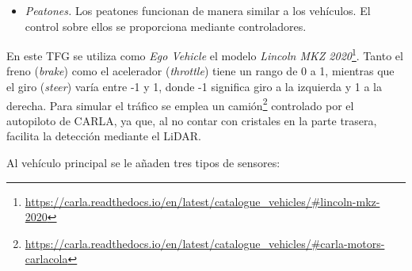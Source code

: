 \begin{itemize}
	\begin{code}[h]
	\begin{lstlisting}[language=python]
	
	vehicle_vp = world.get_blueprint_library().find(vehicle_type)
	vehicle_vp.set_attribute('role_name', 'hero') # Ego vehicle
	ego_vehicle = world.spawn_actor(vehicle_bp, transform)
	ego_vehicle.apply_control(carla.VehicleControl(throttle=0.5, steer=0.1, brake=0.01))

	\end{lstlisting}
	\caption[Configuración de \textit{Ego Vehicle} en CARLA]{Configuración de \textit{Ego Vehicle} en CARLA.}
	\label{cod:ego_carla}
	\end{code}
    \item \textit{Peatones.} Los peatones funcionan de manera similar a los vehículos. El control sobre ellos se proporciona mediante controladores.
\end{itemize}

En este \ac{TFG} se utiliza como \textit{Ego Vehicle} el modelo \textit{Lincoln MKZ 2020}\footnote{\url{https://carla.readthedocs.io/en/latest/catalogue_vehicles/\#lincoln-mkz-2020}}. Tanto el freno (\textit{brake}) como el acelerador (\textit{throttle}) tiene un rango de 0 a 1, mientras que el giro (\textit{steer}) varía entre -1 y 1, donde -1 significa giro a la izquierda y 1 a la derecha. Para simular el tráfico se emplea un camión\footnote{\url{https://carla.readthedocs.io/en/latest/catalogue_vehicles/\#carla-motors-carlacola}} controlado por el autopiloto de CARLA, ya que, al no contar con cristales en la parte trasera, facilita la detección mediante el \ac{LiDAR}.

Al vehículo principal se le añaden tres tipos de sensores:

